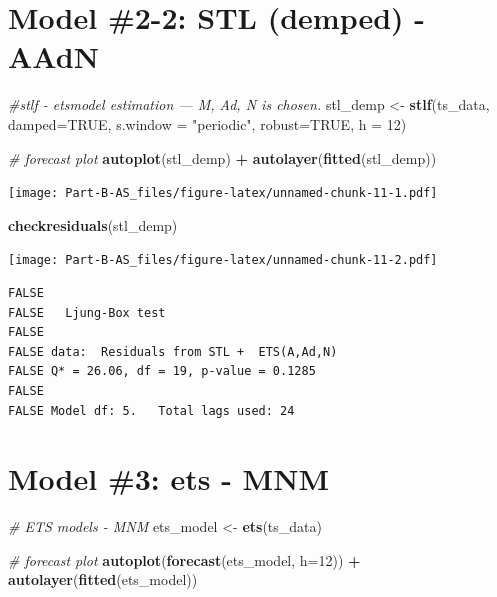 \documentclass[openany]{book}
\newenvironment{Shaded}{\begin{snugshade}}{\end{snugshade}}
\newcommand{\KeywordTok}[1]{\textcolor[rgb]{0.13,0.29,0.53}{\textbf{#1}}}
\newcommand{\DataTypeTok}[1]{\textcolor[rgb]{0.13,0.29,0.53}{#1}}
\newcommand{\DecValTok}[1]{\textcolor[rgb]{0.00,0.00,0.81}{#1}}
\newcommand{\StringTok}[1]{\textcolor[rgb]{0.31,0.60,0.02}{#1}}
\newcommand{\CommentTok}[1]{\textcolor[rgb]{0.56,0.35,0.01}{\textit{#1}}}
\newcommand{\OtherTok}[1]{\textcolor[rgb]{0.56,0.35,0.01}{#1}}
\newcommand{\OperatorTok}[1]{\textcolor[rgb]{0.81,0.36,0.00}{\textbf{#1}}}
\newcommand{\NormalTok}[1]{#1}
\begin{document}
\chapter{Model \#2-2: STL (demped) -
AAdN}\label{model-2-2-stl-demped---aadn}

\begin{Shaded}
\begin{Highlighting}[]
\CommentTok{#stlf - etsmodel estimation --- M, Ad, N is chosen.}
\NormalTok{stl_demp <-}\StringTok{ }\KeywordTok{stlf}\NormalTok{(ts_data, }\DataTypeTok{damped=}\OtherTok{TRUE}\NormalTok{, }\DataTypeTok{s.window =} \StringTok{"periodic"}\NormalTok{, }\DataTypeTok{robust=}\OtherTok{TRUE}\NormalTok{, }\DataTypeTok{h =} \DecValTok{12}\NormalTok{)}

\CommentTok{# forecast plot}
\KeywordTok{autoplot}\NormalTok{(stl_demp) }\OperatorTok{+}\StringTok{ }\KeywordTok{autolayer}\NormalTok{(}\KeywordTok{fitted}\NormalTok{(stl_demp))}
\end{Highlighting}
\end{Shaded}

\texttt{[image: Part-B-AS\_files/figure-latex/unnamed-chunk-11-1.pdf]}

\begin{Shaded}
\begin{Highlighting}[]
\KeywordTok{checkresiduals}\NormalTok{(stl_demp)}
\end{Highlighting}
\end{Shaded}

\texttt{[image: Part-B-AS\_files/figure-latex/unnamed-chunk-11-2.pdf]}

\begin{verbatim}
FALSE 
FALSE   Ljung-Box test
FALSE 
FALSE data:  Residuals from STL +  ETS(A,Ad,N)
FALSE Q* = 26.06, df = 19, p-value = 0.1285
FALSE 
FALSE Model df: 5.   Total lags used: 24
\end{verbatim}

\chapter{Model \#3: ets - MNM}\label{model-3-ets---mnm}

\begin{Shaded}
\begin{Highlighting}[]
\CommentTok{# ETS models - MNM}
\NormalTok{ets_model <-}\StringTok{ }\KeywordTok{ets}\NormalTok{(ts_data)}

\CommentTok{# forecast plot}
\KeywordTok{autoplot}\NormalTok{(}\KeywordTok{forecast}\NormalTok{(ets_model, }\DataTypeTok{h=}\DecValTok{12}\NormalTok{)) }\OperatorTok{+}\StringTok{ }\KeywordTok{autolayer}\NormalTok{(}\KeywordTok{fitted}\NormalTok{(ets_model))}
\end{Highlighting}
\end{Shaded}
\end{document}
